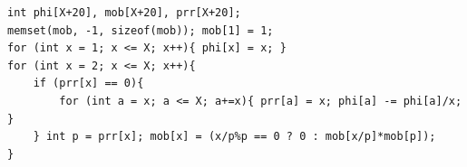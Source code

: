 \begin{verbatim}
int phi[X+20], mob[X+20], prr[X+20];
memset(mob, -1, sizeof(mob)); mob[1] = 1;
for (int x = 1; x <= X; x++){ phi[x] = x; }
for (int x = 2; x <= X; x++){
	if (prr[x] == 0){
		for (int a = x; a <= X; a+=x){ prr[a] = x; phi[a] -= phi[a]/x; }
	} int p = prr[x]; mob[x] = (x/p%p == 0 ? 0 : mob[x/p]*mob[p]);
}
\end{verbatim}